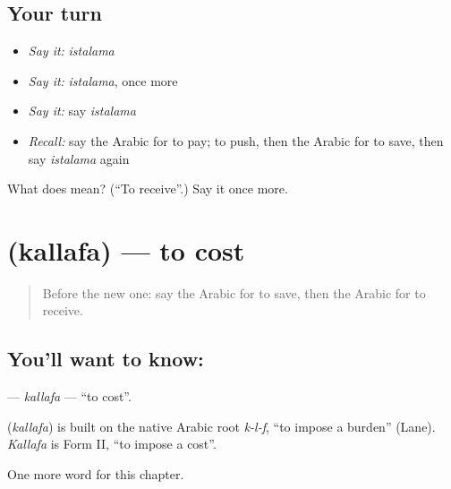 \subsection*{Your turn}
\begin{itemize}
\raggedright
  \item \emph{Say it:} \emph{istalama}
  \item \emph{Say it:} \emph{istalama}, once more
  \item \emph{Say it:} say \emph{istalama}
  \item \emph{Recall:} say the Arabic for to pay; to push, then the Arabic for to save, then say \emph{istalama} again
\end{itemize}

\begin{tcolorbox}[breakable,colback=teal!4,colframe=teal!35!black,title={Before you move on}]
What does  mean? (\textquotedblleft{}To receive\textquotedblright{}.) Say it once more.
\end{tcolorbox}
\section[\texorpdfstring{\ar{كلف} (kallafa)}{كلف (kallafa)}]{ (kallafa) — to cost}

\label{lesson:AR-C192-kallafa}



\begin{quote}
Before the new one: say the Arabic for to save, then the Arabic for to receive.
\end{quote}

\subsection*{You'll want to know: }
\textbf{} — \emph{kallafa} — \textquotedblleft{}to cost\textquotedblright{}.

\begin{cousinweb}
\textbf{} (\emph{kallafa}) is built on the native Arabic root \emph{k-l-f}, \textquotedblleft{}to impose a burden\textquotedblright{} (Lane). \emph{Kallafa} is Form II, \textquotedblleft{}to impose a cost\textquotedblright{}.
\end{cousinweb}

\begin{grammarlens}[title={What you've built}]
One more word for this chapter.
\end{grammarlens}


